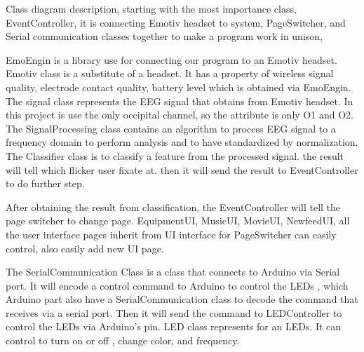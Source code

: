 Class diagram description, starting with the most importance class, EventController, it is connecting Emotiv headset to system, PageSwitcher, and Serial communication classes together to make a program work in unison,

EmoEngin is a library use for connecting our program to an Emotiv headset. Emotiv class is a substitute of a headset. It has a property of wireless signal quality, electrode contact quality, battery level which is obtained via EmoEngin. The signal class represents the EEG signal that obtains from Emotiv headset. In this project is use the only occipital channel, so the attribute is only O1 and O2. The SignalProcessing class contains an algorithm to process EEG signal to a frequency domain to perform analysis and to have standardized by normalization. The Classifier class is to classify a feature from the processed signal. the result will tell which flicker user fixate at. then it will send the result to EventController to do further step.

After obtaining the result from classification, the EventController will tell the page switcher to change page. EquipmentUI, MusicUI, MovieUI, NewfeedUI, all the user interface pages inherit from UI interface for PageSwitcher can easily control, also easily add new UI page.

The SerialCommunication Class is a class that connects to Arduino via Serial port. It will encode a control command to Arduino to control the LEDs , which Arduino part also have a SerialCommunication class to decode the command that receives via a serial port. Then it will send the command to LEDController to control the LEDs via Arduino's pin. LED class represents for an LEDs. It can control to turn on or off , change color, and frequency.